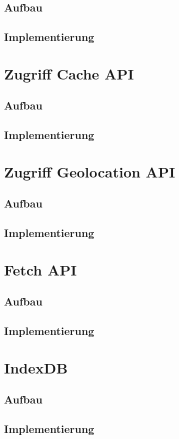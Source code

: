 
\subsection{Aufbau}
\subsection{Implementierung}

\section{Zugriff Cache API}
\subsection{Aufbau}
\subsection{Implementierung}



\section{Zugriff Geolocation API}
\subsection{Aufbau}
\subsection{Implementierung}



\section{Fetch API}
\subsection{Aufbau}
\subsection{Implementierung}


\section{IndexDB}
\subsection{Aufbau}
\subsection{Implementierung}






